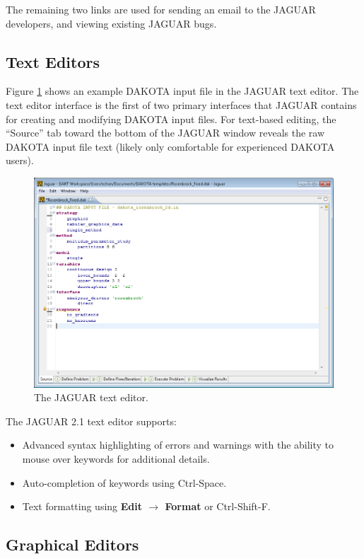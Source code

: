 The remaining two links are used for sending an email to the JAGUAR
developers, and viewing existing JAGUAR bugs.

\subsection{Text Editors}

Figure \ref{fig:input:jag_texteditor} shows an example DAKOTA input
file in the JAGUAR text editor.  The text editor interface is the
first of two primary interfaces that JAGUAR contains for creating and
modifying DAKOTA input files.  For text-based editing, the ``Source''
tab toward the bottom of the JAGUAR window reveals the raw DAKOTA
input file text (likely only comfortable for experienced DAKOTA
users).
\begin{figure}
  \centering
  \includegraphics[scale=0.4]{images/2_1jag_texteditor}
  \caption{The JAGUAR text editor.}
  \label{fig:input:jag_texteditor}
\end{figure}

The JAGUAR 2.1 text editor supports:
\begin{itemize}
\item Advanced syntax highlighting of errors and warnings with the ability to mouse over keywords for additional details.
\item Auto-completion of keywords using Ctrl-Space.
\item Text formatting using {\bf Edit $\rightarrow$ Format} or Ctrl-Shift-F. 
\end{itemize}

\subsection{Graphical Editors}

